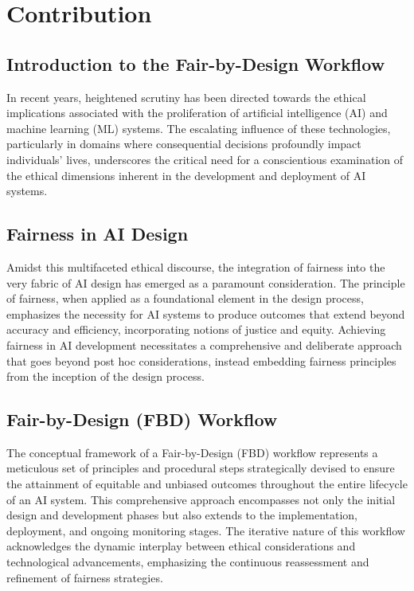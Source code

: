 \chapter{Contribution} %
\label{chap:contribution}

\section{Introduction to the Fair-by-Design Workflow}
\label{section:workflow-introduction}

In recent years, heightened scrutiny has been directed towards the ethical implications associated with the proliferation of artificial intelligence (AI) and machine learning (ML) systems. The escalating influence of these technologies, particularly in domains where consequential decisions profoundly impact individuals' lives, underscores the critical need for a conscientious examination of the ethical dimensions inherent in the development and deployment of AI systems.

\section*{Fairness in AI Design}

Amidst this multifaceted ethical discourse, the integration of fairness into the very fabric of AI design has emerged as a paramount consideration. The principle of fairness, when applied as a foundational element in the design process, emphasizes the necessity for AI systems to produce outcomes that extend beyond accuracy and efficiency, incorporating notions of justice and equity. Achieving fairness in AI development necessitates a comprehensive and deliberate approach that goes beyond post hoc considerations, instead embedding fairness principles from the inception of the design process.

\section*{Fair-by-Design (FBD) Workflow}

The conceptual framework of a Fair-by-Design (FBD) workflow represents a meticulous set of principles and procedural steps strategically devised to ensure the attainment of equitable and unbiased outcomes throughout the entire lifecycle of an AI system. This comprehensive approach encompasses not only the initial design and development phases but also extends to the implementation, deployment, and ongoing monitoring stages. The iterative nature of this workflow acknowledges the dynamic interplay between ethical considerations and technological advancements, emphasizing the continuous reassessment and refinement of fairness strategies.

